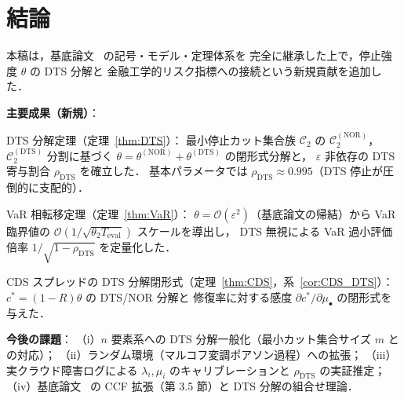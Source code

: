 \documentclass[12pt,a4paper]{article}
\theoremstyle{plain}
\theoremstyle{definition}
\theoremstyle{remark}
\newcommand{\calO}{\mathcal{O}}        %
\newcommand{\eps}{\varepsilon}         %
\newcommand{\calCtwo}{\mathcal{C}_2}   %
\newcommand{\calCNOR}{\calCtwo^{(\mathrm{NOR})}}
\newcommand{\calCDTS}{\calCtwo^{(\mathrm{DTS})}}
\newcommand{\thetaNOR}{\theta^{(\mathrm{NOR})}}
\newcommand{\thetaDTS}{\theta^{(\mathrm{DTS})}}
\newcommand{\rhoDTS}{\rho_{\mathrm{DTS}}}
\begin{document}
\section{結論}\label{sec:conclusion}

本稿は，基底論文~\cite{habase:v7} の記号・モデル・定理体系を
完全に継承した上で，停止強度 $\theta$ の DTS 分解と
金融工学的リスク指標への接続という新規貢献を追加した．

\textbf{主要成果（新規）}：

DTS 分解定理（定理~\ref{thm:DTS}）：
最小停止カット集合族 $\calCtwo$ の $\calCNOR$，$\calCDTS$ 分割に基づく
$\theta = \thetaNOR + \thetaDTS$ の閉形式分解と，
$\eps$ 非依存の DTS 寄与割合 $\rhoDTS$ を確立した．
基本パラメータでは $\rhoDTS \approx 0.995$（DTS 停止が圧倒的に支配的）．

VaR 相転移定理（定理~\ref{thm:VaR}）：
$\theta = \calO(\eps^2)$（基底論文の帰結）から VaR 臨界値の
$\calO(1/\sqrt{\theta_2 T_{\mathrm{eval}}})$ スケールを導出し，
DTS 無視による VaR 過小評価倍率 $1/\sqrt{1-\rhoDTS}$ を定量化した．

CDS スプレッドの DTS 分解閉形式（定理~\ref{thm:CDS}，系~\ref{cor:CDS_DTS}）：
$c^* = (1-R)\theta$ の DTS/NOR 分解と
修復率に対する感度 $\partial c^*/\partial\mu_{\bullet}$ の閉形式を与えた．

\textbf{今後の課題}：
（i）$n$ 要素系への DTS 分解一般化（最小カット集合サイズ $m$ との対応）；
（ii）ランダム環境（マルコフ変調ポアソン過程）への拡張；
（iii）実クラウド障害ログによる $\lambda_i,\mu_i$ のキャリブレーションと
      $\rhoDTS$ の実証推定；
（iv）基底論文~\cite{habase:v7} の CCF 拡張（第 3.5 節）と
      DTS 分解の組合せ理論．
\end{document}
